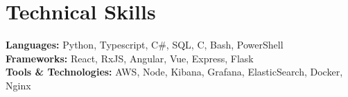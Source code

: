 \documentclass[letterpaper,10pt]{article}
\makeatletter
\newcommand{\resumeItem}[1]{
  \item\small{
    {#1 \vspace{-2pt}}
  }
}
\newcommand{\resumeProjectHeading}[2]{
    \vspace{-2pt}\item
    \begin{tabular*}{0.97\textwidth}{l@{\extracolsep{\fill}}r}
      \small#1 & #2 \\
    \end{tabular*}\vspace{-7pt}
}
\newcommand{\resumeOrganizationHeading}[4]{
  \vspace{-2pt}\item
    \begin{tabular*}{0.97\textwidth}[t]{l@{\extracolsep{\fill}}r}
      \textbf{#1} & \textit{\small #2} \\
      \textit{\small#3}
    \end{tabular*}\vspace{-7pt}
}
\newcommand{\resumeSubHeadingListStart}{\begin{itemize}[leftmargin=0.15in, label={}]}
\newcommand{\resumeSubHeadingListEnd}{\end{itemize}}
\newcommand{\resumeItemListStart}{\begin{itemize}}
\newcommand{\resumeItemListEnd}{\end{itemize}\vspace{-5pt}}
\makeatother
\begin{document}
      
      



\section{Technical Skills}
  \vspace{2pt}
  \resumeSubHeadingListStart
    \small{\item{
        \textbf{Languages:}{ Python, Typescript, C\#, SQL, C, Bash, PowerShell
        } \\ \vspace{3pt}
        \textbf{Frameworks:}{ React, RxJS, Angular, Vue, Express, Flask} \\ \vspace{3pt}
        \textbf{Tools \& Technologies:}{ AWS, Node, Kibana, Grafana, ElasticSearch, Docker, Nginx} \\
    }}
  \resumeSubHeadingListEnd



    
    

\end{document}
